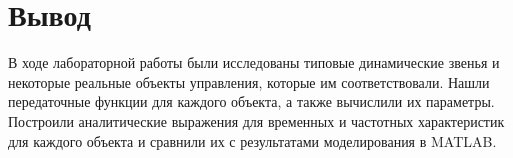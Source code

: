 \chapter{Вывод}
В ходе лабораторной работы были исследованы типовые динамические звенья 
и некоторые реальные объекты управления, которые им соответствовали.
Нашли передаточные функции для каждого объекта, а также вычислили их параметры.
Построили аналитические выражения  для временных и частотных характеристик 
для каждого объекта и сравнили их с результатами моделирования в MATLAB.

\endinput